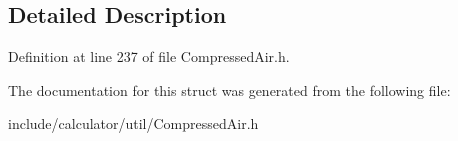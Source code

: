 \subsection{Detailed Description}


Definition at line 237 of file Compressed\+Air.\+h.



The documentation for this struct was generated from the following file\+:\begin{DoxyCompactItemize}
\item 
include/calculator/util/Compressed\+Air.\+h\end{DoxyCompactItemize}
